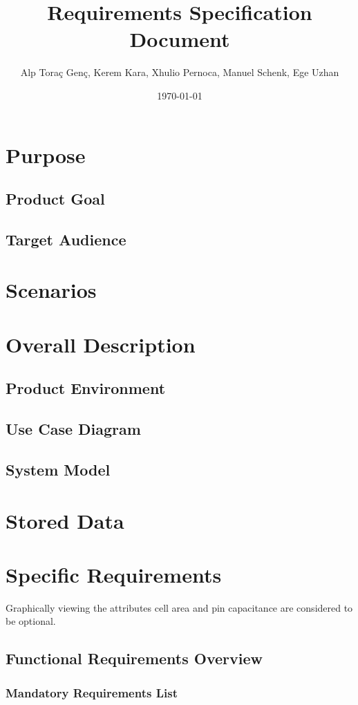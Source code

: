 \documentclass[10pt,a4paper]{report}
\title{Requirements Specification Document}
\author{Alp Toraç Genç, Kerem Kara, Xhulio Pernoca, Manuel Schenk, Ege Uzhan}
\date{\today}
\begin{document}
\maketitle
\label{sec:title}
\tableofcontents

\chapter{Purpose}
\section{Product Goal}
\section{Target Audience}
\chapter{Scenarios}

\chapter{Overall Description}
\section{Product Environment}
\section{Use Case Diagram}
\section{System Model}

\chapter{Stored Data}

\chapter{Specific Requirements}
Graphically viewing the attributes cell area and pin capacitance are considered to be optional.
\section{Functional Requirements Overview}
\subsection{Mandatory Requirements List}
\end{document}
